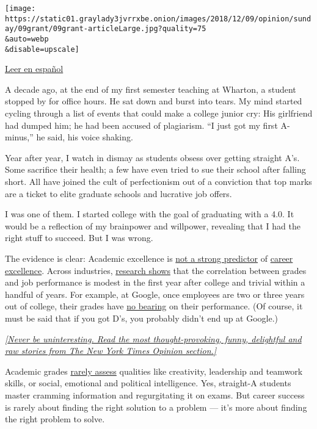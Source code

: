 \texttt{[image: https://static01.graylady3jvrrxbe.onion/images/2018/12/09/opinion/sunday/09grant/09grant-articleLarge.jpg?quality=75\\\&auto=webp\\\&disable=upscale]}

\href{https://www.nytimes3xbfgragh.onion/es/2018/12/11/obsesion-calificaciones/?}{Leer
en español}

A decade ago, at the end of my first semester teaching at Wharton, a
student stopped by for office hours. He sat down and burst into tears.
My mind started cycling through a list of events that could make a
college junior cry: His girlfriend had dumped him; he had been accused
of plagiarism. ``I just got my first A-minus,'' he said, his voice
shaking.

Year after year, I watch in dismay as students obsess over getting
straight A's. Some sacrifice their health; a few have even tried to sue
their school after falling short. All have joined the cult of
perfectionism out of a conviction that top marks are a ticket to elite
graduate schools and lucrative job offers.

I was one of them. I started college with the goal of graduating with a
4.0. It would be a reflection of my brainpower and willpower, revealing
that I had the right stuff to succeed. But I was wrong.

The evidence is clear: Academic excellence is
\href{https://link.springer.com/article/10.1007/BF00974070}{not a strong
predictor} of
\href{http://journals.sagepub.com/doi/abs/10.3102/00028312021002311}{career
excellence}. Across industries,
\href{http://psycnet.apa.org/record/1997-41278-008}{research shows} that
the correlation between grades and job performance is modest in the
first year after college and trivial within a handful of years. For
example, at Google, once employees are two or three years out of
college, their grades have
\href{https://www.amazon.com/Work-Rules-Insights-Inside-Transform/dp/1455554790}{no
bearing} on their performance. (Of course, it must be said that if you
got D's, you probably didn't end up at Google.)

\href{https://www.nytimes3xbfgragh.onion/newsletters/sunday-best?action=click\&module=Intentional\&pgtype=Article}{\emph{{[}Never
be uninteresting. Read the most thought-provoking, funny, delightful and
raw stories from The New York Times Opinion section.{]}}}

Academic grades
\href{https://www.nytimes3xbfgragh.onion/2016/09/11/opinion/sunday/why-we-should-stop-grading-students-on-a-curve.html}{rarely
assess} qualities like creativity, leadership and teamwork skills, or
social, emotional and political intelligence. Yes, straight-A students
master cramming information and regurgitating it on exams. But career
success is rarely about finding the right solution to a problem --- it's
more about finding the right problem to solve.


